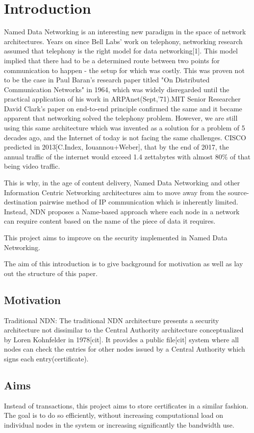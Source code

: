 \chapter{Introduction}
Named Data Networking is an interesting new paradigm in the space of network architectures. Years on since Bell Labs' work on telephony, networking research assumed that telephony is the right model for data networking[1]. This model implied that there had to be a determined route between two points for communication to happen - the setup for which was costly. This was proven not to be the case in Paul Baran's research paper titled "On Distributed Communication Networks" in 1964, which was widely disregarded until the practical application of his work in ARPAnet(Sept,'71).MIT Senior Researcher David Clark's paper on end-to-end principle confirmed the same and it became apparent that networking solved the telephony problem. However, we are still using this same architecture which was invented as a solution for a problem of 5 decades ago, and the Internet of today is not facing the same challenges. CISCO predicted in 2013[C.Index, Iouannou+Weber], that by the end of 2017, the annual traffic of the internet would exceed 1.4 zettabytes with almost 80\% of that being video traffic.

This is why, in the age of content delivery, Named Data Networking and other Information Centric Networking architectures aim to move away from the source-destination pairwise method of IP communication which is inherently limited. Instead, NDN proposes a Name-based approach where each node in a network can require content based on the name of the piece of data it requires. 

This project aims to improve on the security implemented in Named Data Networking.


The aim of this introduction is to give background for motivation as well as lay out the structure of this paper.
\section{Motivation}
Traditional NDN: The traditional NDN architecture presents a security architecture not dissimilar to the Central Authority architecture conceptualized by Loren Kohnfelder in 1978[cit]. It provides a public file[cit] system where all nodes can check the entries for other nodes issued by a Central Authority which signs each entry(certificate). 

\section{Aims}
Instead of transactions, this project aims to store certificates in a similar fashion. The goal is to do so efficiently, without increasing computational load on individual nodes in the system or increasing significantly the bandwidth use.

